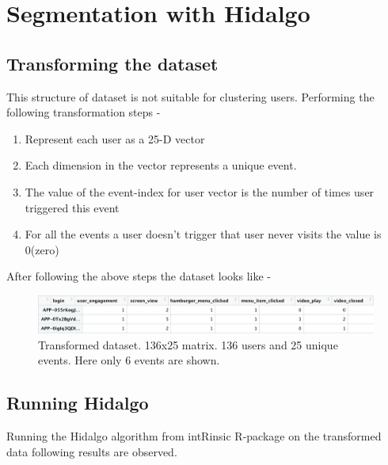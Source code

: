 \documentclass{article}
\begin{document}
\section{Segmentation with Hidalgo}

\subsection{Transforming the dataset}
This structure of dataset is not suitable for clustering users. Performing the following transformation steps - 
\begin{enumerate}
    \item Represent each user as a 25-D vector
    \item Each dimension in the vector represents a unique event.
    \item The value of the event-index for user vector is the number of times user triggered this event
    \item For all the events a user doesn't trigger that user never visits the value is 0(zero)
\end{enumerate}

After following the above steps the dataset looks like - 

\begin{figure}[H]
\centering
  \includegraphics[width=1\textwidth]{Trandformed.png}
  \caption{Transformed dataset. 136x25 matrix. 136 users and 25 unique events. Here only 6 events are shown.}
\label{fig}
\end{figure}

\subsection{Running Hidalgo}
Running the Hidalgo algorithm from intRinsic R-package on the transformed data following results are observed.
\end{document}
